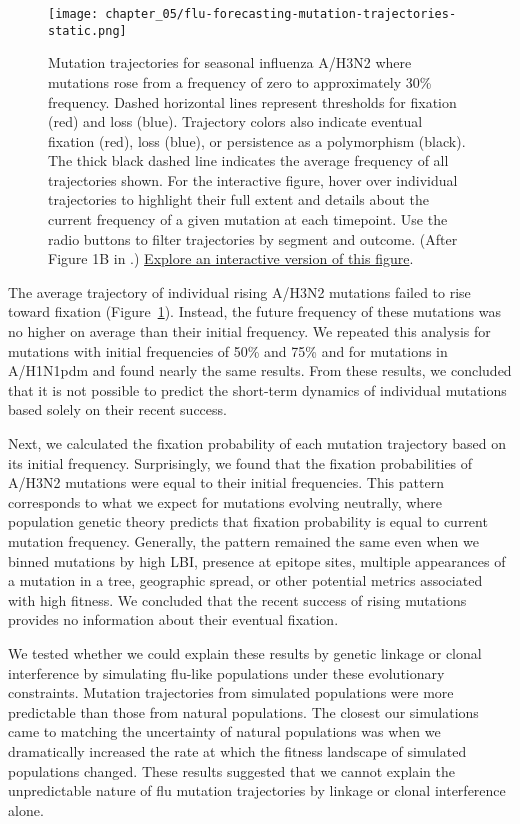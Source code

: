 \begin{figure}
  \centering
  \texttt{[image: chapter\_05/flu-forecasting-mutation-trajectories-static.png]}
  \caption{Mutation trajectories for seasonal influenza A/H3N2 where mutations rose from a frequency of zero to approximately 30\% frequency.
    Dashed horizontal lines represent thresholds for fixation (red) and loss (blue).
    Trajectory colors also indicate eventual fixation (red), loss (blue), or persistence as a polymorphism (black).
    The thick black dashed line indicates the average frequency of all trajectories shown.
    For the interactive figure, hover over individual trajectories to highlight their full extent and details about the current frequency of a given mutation at each timepoint.
    Use the radio buttons to filter trajectories by segment and outcome.
    (After Figure 1B in \citet{Barrat-Charlaix2020}.)
    \href{https://bedford.io/blog/predicting-seasonal-influenza-evolution/}{Explore an interactive version of this figure}.\label{fig:mutation-trajectories} }
\end{figure}

The average trajectory of individual rising A/H3N2 mutations failed to rise toward fixation (Figure~\ref{fig:mutation-trajectories}).
Instead, the future frequency of these mutations was no higher on average than their initial frequency.
We repeated this analysis for mutations with initial frequencies of 50\% and 75\% and for mutations in A/H1N1pdm and found nearly the same results.
From these results, we concluded that it is not possible to predict the short-term dynamics of individual mutations based solely on their recent success.

Next, we calculated the fixation probability of each mutation trajectory based on its initial frequency.
Surprisingly, we found that the fixation probabilities of A/H3N2 mutations were equal to their initial frequencies.
This pattern corresponds to what we expect for mutations evolving neutrally, where population genetic theory predicts that fixation probability is equal to current mutation frequency.
Generally, the pattern remained the same even when we binned mutations by high LBI, presence at epitope sites, multiple appearances of a mutation in a tree, geographic spread, or other potential metrics associated with high fitness.
We concluded that the recent success of rising mutations provides no information about their eventual fixation.

We tested whether we could explain these results by genetic linkage or clonal interference by simulating flu-like populations under these evolutionary constraints.
Mutation trajectories from simulated populations were more predictable than those from natural populations.
The closest our simulations came to matching the uncertainty of natural populations was when we dramatically increased the rate at which the fitness landscape of simulated populations changed.
These results suggested that we cannot explain the unpredictable nature of flu mutation trajectories by linkage or clonal interference alone.

